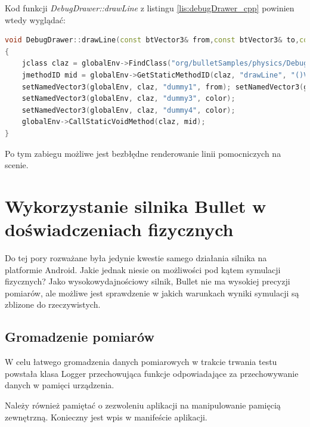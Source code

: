 \newpage
Kod funkcji \emph{DebugDrawer::drawLine} z listingu \ref{lis:debugDrawer_cpp}
powinien wtedy wyglądać:

\begin{lstlisting}[language=C++,
caption=Implementacja metody drawLine
korzystającej z tymczasowych zmiennych,label=lis:drawLineDummyVals]
void DebugDrawer::drawLine(const btVector3& from,const btVector3& to,const btVector3& color)
{
	jclass claz = globalEnv->FindClass("org/bulletSamples/physics/DebugDrawer");
	jmethodID mid = globalEnv->GetStaticMethodID(claz, "drawLine", "()V");
	setNamedVector3(globalEnv, claz, "dummy1", from); setNamedVector3(globalEnv, claz, "dummy2", to); 
	setNamedVector3(globalEnv, claz, "dummy3", color);
	setNamedVector3(globalEnv, claz, "dummy4", color);
	globalEnv->CallStaticVoidMethod(claz, mid);
}
\end{lstlisting}

Po tym zabiegu możliwe jest bezbłędne renderowanie linii pomocniczych na scenie.


\newpage
\section{Wykorzystanie silnika Bullet w doświadczeniach
fizycznych}\label{sec:wykorzystanie}
Do tej pory rozważane była jedynie kwestie
samego działania silnika na platformie Android. Jakie jednak niesie on możliwości pod kątem symulacji
fizycznych? Jako wysokowydajnościowy silnik, Bullet nie ma wysokiej precyzji
pomiarów, ale możliwe jest sprawdzenie w jakich warunkach wyniki symulacji są
zblizone do rzeczywistych.

\subsection{Gromadzenie pomiarów}
W celu łatwego gromadzenia danych pomiarowych w trakcie trwania testu powstała
klasa Logger przechowująca funkcje odpowiadające za przechowywanie danych w
pamięci urządzenia.
  
Należy również pamiętać o zezwoleniu aplikacji na manipulowanie pamięcią
zewnętrzną. Konieczny jest wpis w manifeście aplikacji.


